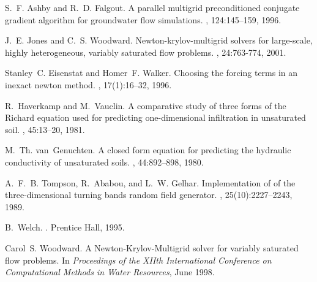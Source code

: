 \begin{thebibliography}{10}

S.~F. Ashby and R.~D. Falgout.
\newblock A parallel multigrid preconditioned conjugate gradient algorithm for
  groundwater flow simulations.
, 124:145--159, 1996.

J.~E. Jones and C.~S. Woodward.
\newblock Newton-krylov-multigrid solvers for large-scale, highly heterogeneous, variably saturated flow problems.
, 24:763-774, 2001.

Stanley~C. Eisenstat and Homer~F. Walker.
\newblock Choosing the forcing terms in an inexact newton method.
, 17(1):16--32, 1996.

R.~Haverkamp and M.~Vauclin.
\newblock A comparative study of three forms of the {R}ichard equation used for
  predicting one-dimensional infiltration in unsaturated soil.
, 45:13--20, 1981.

M.~Th. \hbox{van Genuchten}.
\newblock A closed form equation for predicting the hydraulic conductivity of
  unsaturated soils.
, 44:892--898, 1980.

A.~F.~B. Tompson, R.~Ababou, and L.~W. Gelhar.
\newblock Implementation of of the three-dimensional turning bands random field
  generator.
, 25(10):2227--2243, 1989.

B.~Welch.
.
\newblock Prentice Hall, 1995.

Carol~S. Woodward.
\newblock A {N}ewton-{K}rylov-{M}ultigrid solver for variably saturated flow
  problems.
\newblock In {\em Proceedings of the XIIth International Conference on
  Computational Methods in Water Resources}, June 1998.

\end{thebibliography}
